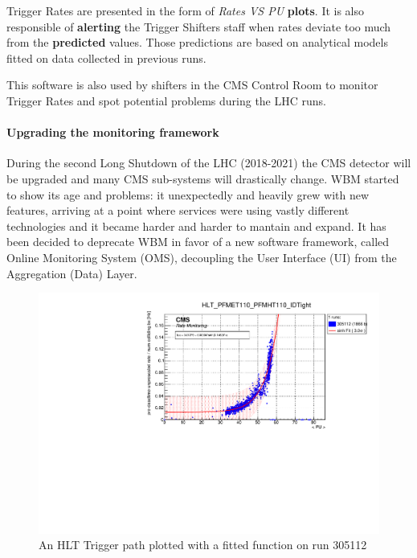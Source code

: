 \documentclass[a4, oneside, 10pt, nobib]{memoir}
\begin{document}
		Trigger Rates are presented in the form of \textit{Rates VS PU} \textbf{plots}. It is also responsible of \textbf{alerting} the Trigger Shifters staff when rates deviate too much from the \textbf{predicted} values. Those predictions are based on analytical models fitted on data collected in previous runs.

		This software is also used by shifters in the CMS Control Room to monitor Trigger Rates and spot potential problems during the LHC runs.


		\paragraph{Upgrading the monitoring framework} 

		During the second Long Shutdown of the LHC (2018-2021) the CMS detector will be upgraded and many CMS sub-systems will drastically change. WBM started to show its age and problems: it unexpectedly and heavily grew with new features, arriving at a point where services were using vastly different technologies and it became harder and harder to mantain and expand. It has been decided to deprecate WBM in favor of a new software framework, called Online Monitoring System (OMS), decoupling the User Interface (UI) from the Aggregation (Data) Layer.

\begin{figure}[H]
    \centerline{
        \includegraphics[width=0.6\paperwidth]{figures/RMT_305112_HLT_PFMET110_PFMHT110_IDTight.pdf}}
    \caption{An HLT Trigger path plotted with a fitted function on run 305112}
    \label{fig:ratemon_hlt}
\end{figure}
\end{document}
